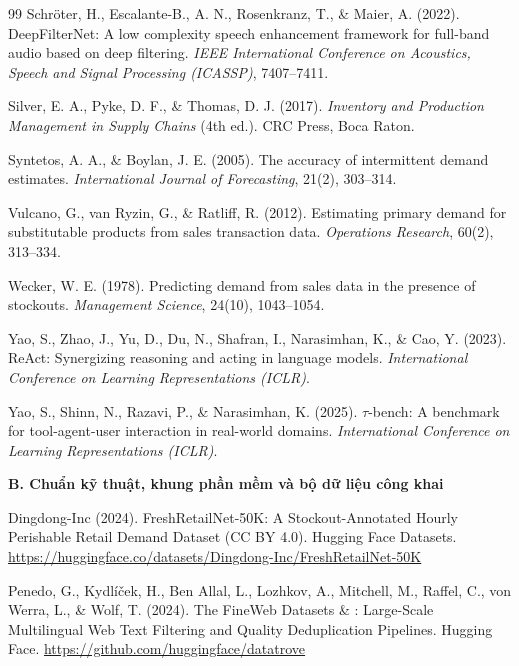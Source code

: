 \begin{thebibliography}{99}
Schr\"oter, H., Escalante-B., A. N., Rosenkranz, T., \& Maier, A. (2022).
DeepFilterNet: A low complexity speech enhancement framework for full-band audio based on deep filtering.
\textit{IEEE International Conference on Acoustics, Speech and Signal Processing (ICASSP)}, 7407--7411.

Silver, E. A., Pyke, D. F., \& Thomas, D. J. (2017).
\textit{Inventory and Production Management in Supply Chains} (4th ed.).
CRC Press, Boca Raton.

Syntetos, A. A., \& Boylan, J. E. (2005).
The accuracy of intermittent demand estimates.
\textit{International Journal of Forecasting}, 21(2), 303--314.

Vulcano, G., van Ryzin, G., \& Ratliff, R. (2012).
Estimating primary demand for substitutable products from sales transaction data.
\textit{Operations Research}, 60(2), 313--334.

Wecker, W. E. (1978).
Predicting demand from sales data in the presence of stockouts.
\textit{Management Science}, 24(10), 1043--1054.

Yao, S., Zhao, J., Yu, D., Du, N., Shafran, I., Narasimhan, K., \& Cao, Y. (2023).
ReAct: Synergizing reasoning and acting in language models.
\textit{International Conference on Learning Representations (ICLR)}.

Yao, S., Shinn, N., Razavi, P., \& Narasimhan, K. (2025).
$\tau$-bench: A benchmark for tool-agent-user interaction in real-world domains.
\textit{International Conference on Learning Representations (ICLR)}.

\item[]\hspace*{-\leftmargin}\textbf{B. Chuẩn kỹ thuật, khung phần mềm và bộ dữ liệu công khai}

Dingdong-Inc (2024).
FreshRetailNet-50K: A Stockout-Annotated Hourly Perishable Retail Demand Dataset (CC BY 4.0).
Hugging Face Datasets. \url{https://huggingface.co/datasets/Dingdong-Inc/FreshRetailNet-50K}

Penedo, G., Kydl\'i\v{c}ek, H., Ben Allal, L., Lozhkov, A., Mitchell, M., Raffel, C., von Werra, L., \& Wolf, T. (2024).
The FineWeb Datasets \& : Large-Scale Multilingual Web Text Filtering and Quality Deduplication Pipelines.
Hugging Face. \url{https://github.com/huggingface/datatrove}


\end{thebibliography}
